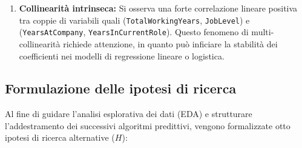 \documentclass[11pt,a4paper]{article}
\begin{document}
\begin{enumerate}
\begin{itemize}
        \item \texttt{EmployeeCount}: Presenta costantemente il valore numerico $1$ per ogni riga. Essa descrive unicamente l'unità di conteggio del singolo lavoratore, risultando priva di utilità predittiva.
        \item \texttt{StandardHours}: Registra per ogni record il valore costante di $80$ ore, configurandosi come un'ulteriore feature a varianza nulla.
        \item \texttt{EmployeeNumber}: Rappresenta il codice identificativo univoco (chiave primaria generata dal sistema HR) di ciascun dipendente. Trattandosi di un codice puramente nominale e privo di legame causale con la propensione all'abbandono, viene escluso dalla fase di addestramento algoritmico per prevenire fenomeni di \textit{overfitting}. Trova tuttavia una collocazione applicativa strategica \textit{a posteriori}, permettendo al management HR di identificare puntualmente le specifiche risorse segnalate come ``ad alto rischio'' dai modelli di classificazione una volta concluso il deployment.
    \end{itemize}
    \item \textbf{Collinearità intrinseca:} Si osserva una forte correlazione lineare positiva tra coppie di variabili quali (\texttt{TotalWorkingYears}, \texttt{JobLevel}) e (\texttt{YearsAtCompany}, \texttt{YearsInCurrentRole}). Questo fenomeno di multi-collinearità richiede attenzione, in quanto può inficiare la stabilità dei coefficienti nei modelli di regressione lineare o logistica.
\end{enumerate}

\subsection{Formulazione delle ipotesi di ricerca}
Al fine di guidare l'analisi esplorativa dei dati (EDA) e strutturare l'addestramento dei successivi algoritmi predittivi, vengono formalizzate otto ipotesi di ricerca alternative ($H$):
\end{document}
